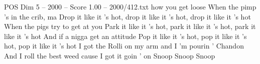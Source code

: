 \begin{textsample}{POS Dim 5 – 2000 – Score 1.00 – 2000/412.txt}
how you get loose When the pimp 's in the crib, ma Drop it like it 's hot, drop it like it 's hot, drop it like it 's hot When the pigs try to get at you Park it like it 's hot, park it like it 's hot, park it like it 's hot And if a nigga get an attitude Pop it like it 's hot, pop it like it 's hot, pop it like it 's hot I got the Rolli on my arm and I 'm pourin ' Chandon And I roll the best weed cause I got it goin ' on Snoop Snoop Snoop

\end{textsample}
